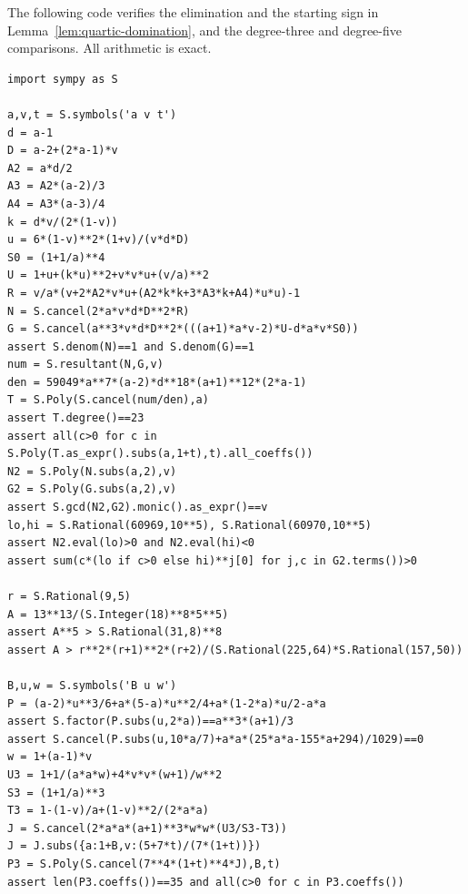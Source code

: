 \documentclass[11pt]{article}
\begin{document}
The following code verifies the elimination and the starting
sign in Lemma~\ref{lem:quartic-domination}, and the
degree-three and degree-five comparisons. All arithmetic is exact.
\begin{verbatim}
import sympy as S

a,v,t = S.symbols('a v t')
d = a-1
D = a-2+(2*a-1)*v
A2 = a*d/2
A3 = A2*(a-2)/3
A4 = A3*(a-3)/4
k = d*v/(2*(1-v))
u = 6*(1-v)**2*(1+v)/(v*d*D)
S0 = (1+1/a)**4
U = 1+u+(k*u)**2+v*v*u+(v/a)**2
R = v/a*(v+2*A2*v*u+(A2*k*k+3*A3*k+A4)*u*u)-1
N = S.cancel(2*a*v*d*D**2*R)
G = S.cancel(a**3*v*d*D**2*(((a+1)*a*v-2)*U-d*a*v*S0))
assert S.denom(N)==1 and S.denom(G)==1
num = S.resultant(N,G,v)
den = 59049*a**7*(a-2)*d**18*(a+1)**12*(2*a-1)
T = S.Poly(S.cancel(num/den),a)
assert T.degree()==23
assert all(c>0 for c in S.Poly(T.as_expr().subs(a,1+t),t).all_coeffs())
N2 = S.Poly(N.subs(a,2),v)
G2 = S.Poly(G.subs(a,2),v)
assert S.gcd(N2,G2).monic().as_expr()==v
lo,hi = S.Rational(60969,10**5), S.Rational(60970,10**5)
assert N2.eval(lo)>0 and N2.eval(hi)<0
assert sum(c*(lo if c>0 else hi)**j[0] for j,c in G2.terms())>0

r = S.Rational(9,5)
A = 13**13/(S.Integer(18)**8*5**5)
assert A**5 > S.Rational(31,8)**8
assert A > r**2*(r+1)**2*(r+2)/(S.Rational(225,64)*S.Rational(157,50))

B,u,w = S.symbols('B u w')
P = (a-2)*u**3/6+a*(5-a)*u**2/4+a*(1-2*a)*u/2-a*a
assert S.factor(P.subs(u,2*a))==a**3*(a+1)/3
assert S.cancel(P.subs(u,10*a/7)+a*a*(25*a*a-155*a+294)/1029)==0
w = 1+(a-1)*v
U3 = 1+1/(a*a*w)+4*v*v*(w+1)/w**2
S3 = (1+1/a)**3
T3 = 1-(1-v)/a+(1-v)**2/(2*a*a)
J = S.cancel(2*a*a*(a+1)**3*w*w*(U3/S3-T3))
J = J.subs({a:1+B,v:(5+7*t)/(7*(1+t))})
P3 = S.Poly(S.cancel(7**4*(1+t)**4*J),B,t)
assert len(P3.coeffs())==35 and all(c>0 for c in P3.coeffs())
\end{verbatim}
\end{document}
